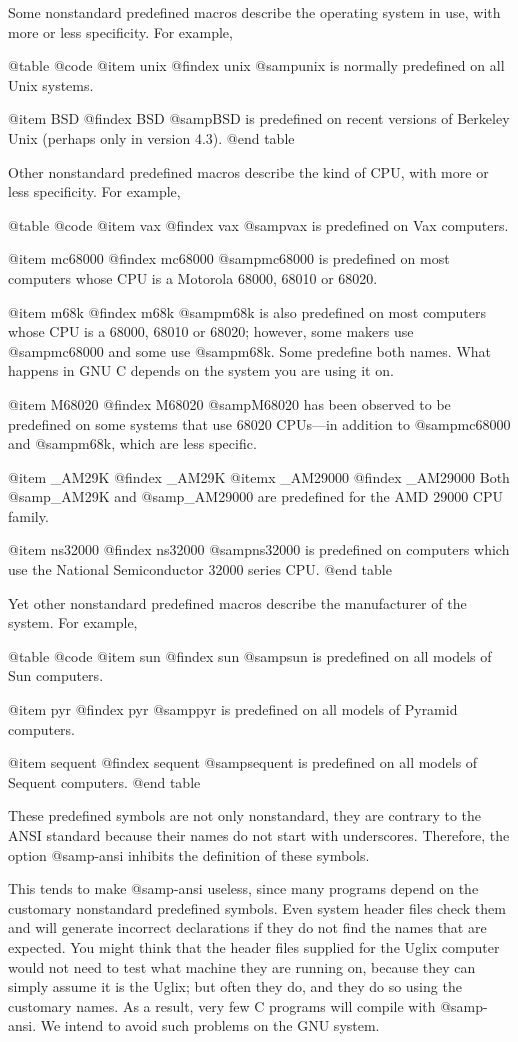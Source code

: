 {Some nonstandard predefined macros describe the operating system in use,
with more or less specificity.  For example,

@table @code
@item unix
@findex unix
@samp{unix} is normally predefined on all Unix systems.

@item BSD
@findex BSD
@samp{BSD} is predefined on recent versions of Berkeley Unix
(perhaps only in version 4.3).
@end table

Other nonstandard predefined macros describe the kind of CPU, with more or
less specificity.  For example,

@table @code
@item vax
@findex vax
@samp{vax} is predefined on Vax computers.

@item mc68000
@findex mc68000
@samp{mc68000} is predefined on most computers whose CPU is a Motorola
68000, 68010 or 68020.

@item m68k
@findex m68k
@samp{m68k} is also predefined on most computers whose CPU is a 68000,
68010 or 68020; however, some makers use @samp{mc68000} and some use
@samp{m68k}.  Some predefine both names.  What happens in GNU C
depends on the system you are using it on.

@item M68020
@findex M68020
@samp{M68020} has been observed to be predefined on some systems that
use 68020 CPUs---in addition to @samp{mc68000} and @samp{m68k}, which
are less specific.

@item _AM29K
@findex _AM29K
@itemx _AM29000
@findex _AM29000
Both @samp{_AM29K} and @samp{_AM29000} are predefined for the AMD 29000
CPU family.

@item ns32000
@findex ns32000
@samp{ns32000} is predefined on computers which use the National
Semiconductor 32000 series CPU.
@end table

Yet other nonstandard predefined macros describe the manufacturer of
the system.  For example,

@table @code
@item sun
@findex sun
@samp{sun} is predefined on all models of Sun computers.

@item pyr
@findex pyr
@samp{pyr} is predefined on all models of Pyramid computers.

@item sequent
@findex sequent
@samp{sequent} is predefined on all models of Sequent computers.
@end table

These predefined symbols are not only nonstandard, they are contrary to the
ANSI standard because their names do not start with underscores.
Therefore, the option @samp{-ansi} inhibits the definition of these
symbols.

This tends to make @samp{-ansi} useless, since many programs depend on the
customary nonstandard predefined symbols.  Even system header files check
them and will generate incorrect declarations if they do not find the names
that are expected.  You might think that the header files supplied for the
Uglix computer would not need to test what machine they are running on,
because they can simply assume it is the Uglix; but often they do, and they
do so using the customary names.  As a result, very few C programs will
compile with @samp{-ansi}.  We intend to avoid such problems on the GNU
system.

}
